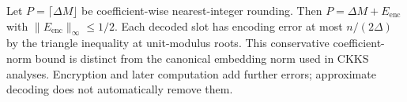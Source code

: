  Let $P=\lceil\Delta M\rfloor$ be coefficient-wise nearest-integer rounding. Then $P=\Delta M+E_{\mathrm{enc}}$ with $\|E_{\mathrm{enc}}\|_\infty\leq 1/2$. Each decoded slot has encoding error at most $n/(2\Delta)$ by the triangle inequality at unit-modulus roots. This conservative coefficient-norm bound is distinct from the canonical embedding norm used in CKKS analyses. Encryption and later computation add further errors; approximate decoding does not automatically remove them.


